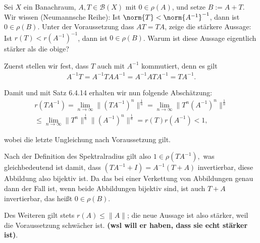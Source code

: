 \begin{exercise}[22/1]

Sei $X$ ein Banachraum, $A, T \in \mathcal{B}(X)$ mit $0 \in \rho(A)$, und setze $B := A + T$.
Wir wissen (Neumannsche Reihe):
Ist $\norm{T} < \norm{A^{-1}}^{-1}$, dann ist $0 \in \rho(B)$.
Unter der Voraussetzung dass $A T = T A$, zeige die stärkere Aussage:
Ist $r(T) < r(A^{-1})^{-1}$, dann ist $0 \in \rho(B)$.
Warum ist diese Aussage eigentlich stärker als die obige?

\end{exercise}

\begin{solution}
  Zuerst stellen wir fest, dass $T$ auch mit $A^{-1}$ kommutiert, denn es gilt
  \begin{align}
      A^{-1}T = A^{-1}TAA^{-1} = A^{-1}ATA^{-1} = TA^{-1}.
  \end{align}

  Damit und mit Satz 6.4.14 erhalten wir nun folgende Abschätzung:
  \begin{align}
      r(TA^{-1}) = \lim\limits_{n \rightarrow \infty}{\|(TA^{-1})^n\|^{\frac{1}{n}}} =
      \lim\limits_{n \rightarrow \infty}{\|T^n(A^{-1})^n\|^{\frac{1}{n}}} \\ \leq
      \lim\limits_{n \rightarrow \infty}{\|T^n\|^{\frac{1}{n}}\|(A^{-1})^n\|^{\frac{1}{n}}} =
      r(T) r(A^{-1}) < 1,
  \end{align}

  wobei die letzte Ungleichung nach Voraussetzung gilt.

  Nach der Definition des Spektralradius gilt also $1 \in \rho(TA^{-1}),$ was gleichbedeutend ist damit, dass $(TA^{-1} + I) = A^{-1} (T + A)$ invertierbar, diese Abbildung also bijektiv ist.
  Da das bei einer Verkettung von Abbildungen genau dann der Fall ist, wenn beide Abbildungen bijektiv sind, ist auch $T + A$ invertierbar, das heißt $0 \in \rho(B).$


  Des Weiteren gilt stets $r(A) \leq \|A\|$; die neue Aussage ist also stärker, weil die Voraussetzung schwächer ist. \textbf{(wsl will er haben, dass sie echt stärker ist)}.
\end{solution}
